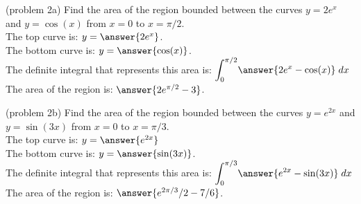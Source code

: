 \documentclass{ximera}
\begin{document}
\begin{problem}(problem 2a)
Find the area of the region bounded between the curves $y = 2e^x$ and $y = \cos(x)$ from $x = 0$ to $x = \pi/2$.\\
The top curve is: $y = \answer{2e^x}$.\\
The bottom curve is: $y = \answer{\cos(x)}$.\\
The definite integral that represents this area is: $\displaystyle{\int_0^{\pi/2}} \answer{2e^x - \cos(x)} \; dx$\\
The area of the region is: $\answer{2e^{\pi/2} - 3}$.
\end{problem}


\begin{problem}(problem 2b)
Find the area of the region bounded between the curves $y = e^{2x}$ and $y = \sin(3x)$ from $x = 0$ to $x = \pi/3$.\\
The top curve is: $y = \answer{e^{2x}}$\\
The bottom curve is: $y = \answer{\sin(3x)}$.\\
The definite integral that represents this area is: $\displaystyle{\int_0^{\pi/3}} \answer{e^{2x} - \sin(3x)} \; dx$\\
The area of the region is: $\answer{e^{2\pi/3}/2 - 7/6}$.
\end{problem}



 
\end{document}
